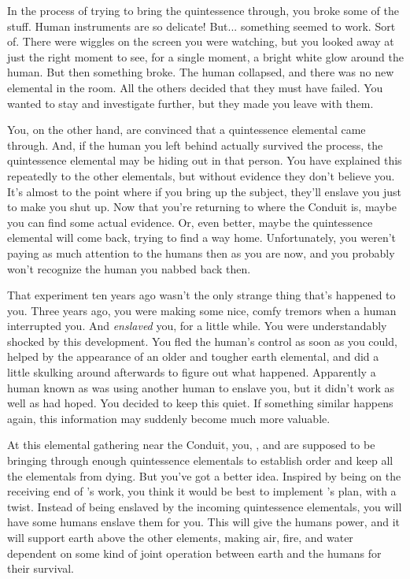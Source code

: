 \documentclass[char]{elementals}
\begin{document}
In the process of trying to bring the quintessence through, you broke some of the stuff.  Human instruments are so delicate!  But... something seemed to work.  Sort of.  There were wiggles on the screen you were watching, but you looked away at just the right moment to see, for a single moment, a bright white glow around the human.  But then something broke.  The human collapsed, and there was no new elemental in the room.  All the others decided that they must have failed.  You wanted to stay and investigate further, but they made you leave with them.

You, on the other hand, are convinced that a quintessence elemental came through.  And, if the human you left behind actually survived the process, the quintessence elemental may be hiding out in that person.  You have explained this repeatedly to the other elementals, but without evidence they don't believe you.  It's almost to the point where if you bring up the subject, they'll enslave you just to make you shut up.  Now that you're returning to where the Conduit is, maybe you can find some actual evidence.  Or, even better, maybe the quintessence elemental will come back, trying to find a way home.  Unfortunately, you weren't paying as much attention to the humans then as you are now, and you probably won't recognize the human you nabbed back then.

That experiment ten years ago wasn't the only strange thing that's happened to you.  Three years ago, you were making some nice, comfy tremors when a human interrupted you.  And {\em enslaved} you, for a little while.  You were understandably shocked by this development.  You fled the human's control as soon as you could, helped by the appearance of an older and tougher earth elemental, and did a little skulking around afterwards to figure out what happened.  Apparently a human known as \cMS{\intro} was using another human to enslave you, but it didn't work as well as \cMS{\they} had hoped.  You decided to keep this quiet.  If something similar happens again, this information may suddenly become much more valuable.

At this elemental gathering near the Conduit, you, \cLoyal{}, and \cMiniEarth{} are supposed to be bringing through enough quintessence elementals to establish order and keep all the elementals from dying.  But you've got a better idea.  Inspired by being on the receiving end of \cMS{}'s work, you think it would be best to implement \cLoyal{}'s plan, with a twist.  Instead of being enslaved by the incoming quintessence elementals, you will have some humans enslave them for you.  This will give the humans power, and it will support earth above the other elements, making air, fire, and water dependent on some kind of joint operation between earth and the humans for their survival.
\end{document}
